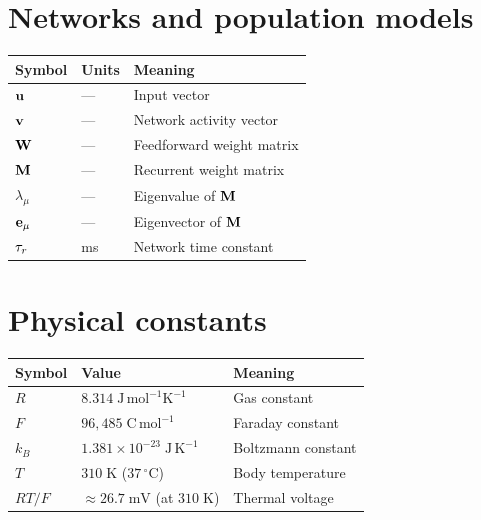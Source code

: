 \section*{Networks and population models}

\begin{tabular}{@{}lll@{}}
  \toprule
  \textbf{Symbol} & \textbf{Units} & \textbf{Meaning} \\
  \midrule
  $\mathbf{u}$ & --- & Input vector \\
  $\mathbf{v}$ & --- & Network activity vector \\
  $\mathbf{W}$ & --- & Feedforward weight matrix \\
  $\mathbf{M}$ & --- & Recurrent weight matrix \\
  $\lambda_\mu$ & --- & Eigenvalue of $\mathbf{M}$ \\
  $\mathbf{e}_\mu$ & --- & Eigenvector of $\mathbf{M}$ \\
  $\tau_r$ & ms & Network time constant \\
  \bottomrule
\end{tabular}

\section*{Physical constants}

\begin{tabular}{@{}lll@{}}
  \toprule
  \textbf{Symbol} & \textbf{Value} & \textbf{Meaning} \\
  \midrule
  $R$ & $8.314\;\text{J}\,\text{mol}^{-1}\text{K}^{-1}$ & Gas constant \\
  $F$ & $96{,}485\;\text{C}\,\text{mol}^{-1}$ & Faraday constant \\
  $k_B$ & $1.381 \times 10^{-23}\;\text{J}\,\text{K}^{-1}$ & Boltzmann constant \\
  $T$ & $310\;\text{K}$ ($37\,^\circ\text{C}$) & Body temperature \\
  $RT/F$ & $\approx 26.7\;\text{mV}$ (at $310\;\text{K}$) & Thermal voltage \\
  \bottomrule
\end{tabular}
